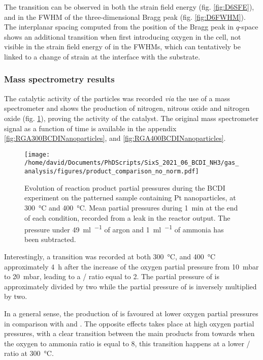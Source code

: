The transition can be observed in both the strain field energy (fig. \ref{fig:D6SFE}), and in the FWHM of the three-dimensional Bragg peak (fig. \ref{fig:D6FWHM}).
The interplanar spacing computed from the position of the Bragg peak in $q$-space shows an additional transition when first introducing oxygen in the cell, not visible in the strain field energy of in the FWHMs, which can tentatively be linked to a change of strain at the interface with the substrate.

\subsubsection{Mass spectrometry results}

The catalytic activity of the particles was recorded \textit{via} the use of a mass spectrometer and shows the production of nitrogen, nitrous oxide and nitrogen oxide (fig. \ref{fig:RGANanoparticlesBCDIComparison}), proving the activity of the catalyst.
The original mass spectrometer signal as a function of time is available in the appendix \ref{fig:RGA300BCDINanoparticles}, and \ref{fig:RGA400BCDINanoparticles}.

\begin{figure}[!htb]
    \centering
    \texttt{[image: /home/david/Documents/PhDScripts/SixS\_2021\_06\_BCDI\_NH3/gas\_analysis/figures/product\_comparison\_no\_norm.pdf]}
    \caption{
        Evolution of reaction product partial pressures during the BCDI experiment on the patterned sample containing Pt nanoparticles, at \qty{300}{\degreeCelsius} and \qty{400}{\degreeCelsius}.
        Mean partial pressures during \qty{1}{\minute} at the end of each condition, recorded from a leak in the reactor output.
        The pressure under \qty{49}{\ml\per\min} of argon and \qty{1}{\ml\per\min} of ammonia has been subtracted.
    }
    \label{fig:RGANanoparticlesBCDIComparison}
\end{figure}

Interestingly, a transition was recorded at both \qty{300}{\degreeCelsius}, and \qty{400}{\degreeCelsius} approximately \qty{4}{\hour} after the increase of the oxygen partial pressure from \qty{10}{\milli\bar} to \qty{20}{\milli\bar}, leading to a / ratio equal to 2.
The partial pressure of  is approximately divided by two while the partial pressure of  is inversely multiplied by two.

In a general sense, the production of  is favoured at lower oxygen partial pressures in comparison with  and .
The opposite effects takes place at high oxygen partial pressures, with a clear transition between the main products from  towards  when the oxygen to ammonia ratio is equal to 8, this transition happens at a lower / ratio at \qty{300}{\degreeCelsius}.
